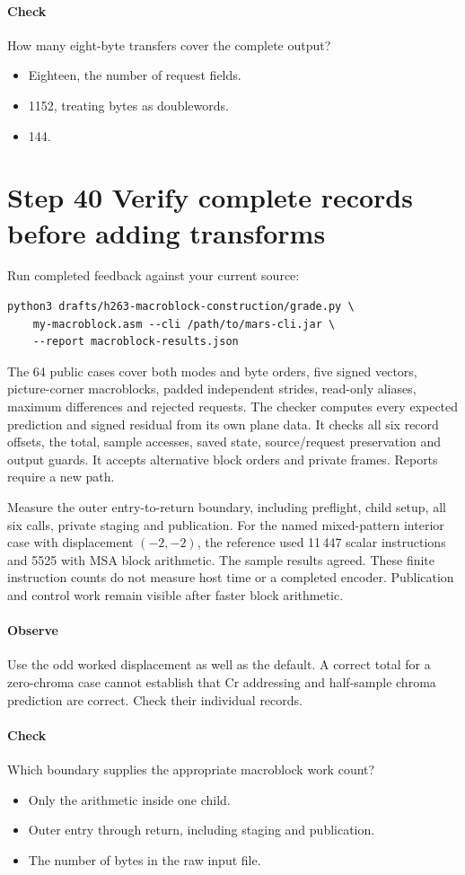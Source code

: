 \paragraph{Check} How many eight-byte transfers cover the complete output?
\begin{itemize}
  \item[A.] Eighteen, the number of request fields.
  \item[B.] 1152, treating bytes as doublewords.
  \item[C.] 144.
\end{itemize}

\section{Step 40 Verify complete records before adding transforms}\label{h263-macroblock-s10}
Run completed feedback against your current source:
\begin{verbatim}
python3 drafts/h263-macroblock-construction/grade.py \
    my-macroblock.asm --cli /path/to/mars-cli.jar \
    --report macroblock-results.json
\end{verbatim}
The 64 public cases cover both modes and byte orders, five signed vectors,
picture-corner macroblocks, padded independent strides, read-only aliases, maximum
differences and rejected requests. The checker computes every expected prediction
and signed residual from its own plane data. It checks all six record offsets,
the total, sample accesses, saved state, source/request preservation and output
guards. It accepts alternative block orders and private frames. Reports require
a new path.

Measure the outer entry-to-return boundary, including preflight, child setup,
all six calls, private staging and publication. For the named mixed-pattern
interior case with displacement $(-2,-2)$, the reference used 11\,447 scalar
instructions and 5525 with MSA block arithmetic. The sample results agreed.
These finite instruction counts do not measure host time or a completed encoder.
Publication and control work remain visible after faster block arithmetic.

\paragraph{Observe} Use the odd worked displacement as well as the default.
A correct total for a zero-chroma case cannot establish that Cr addressing and
half-sample chroma prediction are correct. Check their individual records.
\Needspace{8\baselineskip}
\paragraph{Check} Which boundary supplies the appropriate macroblock work count?
\begin{itemize}
  \item[A.] Only the arithmetic inside one child.
  \item[B.] Outer entry through return, including staging and publication.
  \item[C.] The number of bytes in the raw input file.
\end{itemize}
